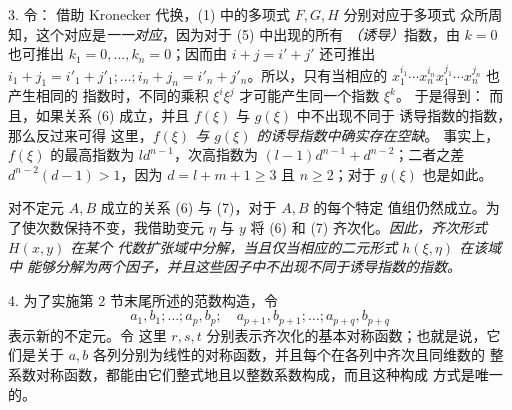 3. 令：
借助 Kronecker 代换，(1) 中的多项式 $F,G,H$ 分别对应于多项式
众所周知，这个对应是\emph{一一对应}，因为对于 (5) 中出现的所有
\emph{（诱导）}指数，由 $k=0$ 也可推出
$k_1=0,\ldots,k_n=0$；因而由 $i+j=i'+j'$ 还可推出
$i_1+j_1=i'_1+j'_1;\ldots;i_n+j_n=i'_n+j'_n$。所以，只有当相应的
$x_1^{i_1}\cdots x_n^{i_n}x_1^{j_1}\cdots x_n^{j_n}$ 也产生相同的
指数时，不同的乘积 $\xi^i\xi^j$ 才可能产生同一个指数 $\xi^k$。
于是得到：
而且，如果关系 (6) 成立，并且 $f(\xi)$ 与 $g(\xi)$ 中不出现不同于
诱导指数的指数，那么反过来可得
这里，\emph{$f(\xi)$ 与 $g(\xi)$ 的诱导指数中确实存在空缺}。
事实上，$f(\xi)$ 的最高指数为 $ld^{n-1}$，次高指数为
$(l-1)d^{n-1}+d^{n-2}$；二者之差
$d^{n-2}(d-1)>1$，因为 $d=l+m+1\ge3$ 且 $n\ge2$；对于
$g(\xi)$ 也是如此。

对不定元 $A,B$ 成立的关系 (6) 与 (7)，对于 $A,B$ 的每个特定
值组仍然成立。为了使次数保持不变，我借助变元 $\eta$ 与 $y$
将 (6) 和 (7) 齐次化。\emph{因此，齐次形式 $H(x,y)$ 在某个
代数扩张域中分解，当且仅当相应的二元形式 $h(\xi,\eta)$ 在该域中
能够分解为两个因子，并且这些因子中不出现不同于诱导指数的指数。}

4. 为了实施第 2 节末尾所述的范数构造，令
\[
 a_1,b_1;\ldots; a_p,b_p;\quad a_{p+1},b_{p+1};\ldots; a_{p+q},b_{p+q}
\]
表示新的不定元。令
这里 $r,s,t$ 分别表示齐次化的基本对称函数；也就是说，它们是关于
$a,b$ 各列分别为线性的对称函数，并且每个在各列中齐次且同维数的
整系数对称函数，都能由它们整式地且以整数系数构成，而且这种构成
方式是唯一的。

